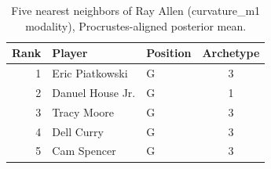 \begin{table}[htbp]
  \centering\small
  \begin{tabular}{rllc}
    \toprule
    Rank & Player & Position & Archetype \\
    \midrule
    1 & Eric Piatkowski & G & 3 \\
    2 & Danuel House Jr. & G & 1 \\
    3 & Tracy Moore & G & 3 \\
    4 & Dell Curry & G & 3 \\
    5 & Cam Spencer & G & 3 \\
    \bottomrule
  \end{tabular}
  \caption{Five nearest neighbors of Ray Allen (curvature_m1 modality), Procrustes-aligned posterior mean.}
  \label{tab:Ray_Allen_neighbors_curvature_m1}
\end{table}

